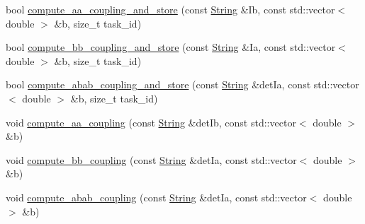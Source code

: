 \begin{DoxyCompactItemize}
bool \mbox{\hyperlink{classforte_1_1_sigma_vector_dynamic_a353b9c88fb8b844fca9a4c78da994394}{compute\+\_\+aa\+\_\+coupling\+\_\+and\+\_\+store}} (const \mbox{\hyperlink{namespaceforte_a840d1bfd3a8b3c16e09979212f37313f}{String}} \&Ib, const std\+::vector$<$ double $>$ \&b, size\+\_\+t task\+\_\+id)
\item 
bool \mbox{\hyperlink{classforte_1_1_sigma_vector_dynamic_a366c37e24eb1e81ab31017afd3879b46}{compute\+\_\+bb\+\_\+coupling\+\_\+and\+\_\+store}} (const \mbox{\hyperlink{namespaceforte_a840d1bfd3a8b3c16e09979212f37313f}{String}} \&Ia, const std\+::vector$<$ double $>$ \&b, size\+\_\+t task\+\_\+id)
\item 
bool \mbox{\hyperlink{classforte_1_1_sigma_vector_dynamic_aeab3e51a9ef41df6a53bbd02be377a75}{compute\+\_\+abab\+\_\+coupling\+\_\+and\+\_\+store}} (const \mbox{\hyperlink{namespaceforte_a840d1bfd3a8b3c16e09979212f37313f}{String}} \&det\+Ia, const std\+::vector$<$ double $>$ \&b, size\+\_\+t task\+\_\+id)
\item 
void \mbox{\hyperlink{classforte_1_1_sigma_vector_dynamic_a1975dd7fd3bc81afee007b01382679f8}{compute\+\_\+aa\+\_\+coupling}} (const \mbox{\hyperlink{namespaceforte_a840d1bfd3a8b3c16e09979212f37313f}{String}} \&det\+Ib, const std\+::vector$<$ double $>$ \&b)
\item 
void \mbox{\hyperlink{classforte_1_1_sigma_vector_dynamic_a05d5d3691dd33c2afb001af2be5902a8}{compute\+\_\+bb\+\_\+coupling}} (const \mbox{\hyperlink{namespaceforte_a840d1bfd3a8b3c16e09979212f37313f}{String}} \&det\+Ia, const std\+::vector$<$ double $>$ \&b)
\item 
void \mbox{\hyperlink{classforte_1_1_sigma_vector_dynamic_a9893c4a50b5a5ef2405dcaa04bbdb312}{compute\+\_\+abab\+\_\+coupling}} (const \mbox{\hyperlink{namespaceforte_a840d1bfd3a8b3c16e09979212f37313f}{String}} \&det\+Ia, const std\+::vector$<$ double $>$ \&b)
\end{DoxyCompactItemize}
